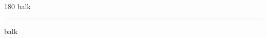 
\begin{frame}
\begin{center}
\begin{turn}{180}
{\fontsize{2.5cm}{1em}\selectfont balk}
\end{turn}
\vspace{1em}\par  
\hrule
\vspace{1em}\par  
{\fontsize{2.5cm}{1em}\selectfont balk}
\end{center}
\end{frame}
